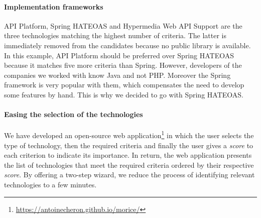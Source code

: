 \paragraph{Implementation frameworks}
API Platform, Spring HATEOAS and Hypermedia Web API Support \cite{salvadori2014framework} are the three technologies matching the highest number of criteria. The latter is immediately removed from the candidates because no public library is available. In this example, API Platform should be preferred over Spring HATEOAS because it matches five more criteria than Spring. However, developers of the companies we worked with know Java and not PHP. Moreover the Spring framework is very popular with them, which compensates the need to develop some features by hand. This is why we decided to go with Spring HATEOAS.

\paragraph{Easing the selection of the technologies}
We have developed an open-source web application{\footnote{\url{https://antoinecheron.github.io/morice/}}} in which the user selects the type of technology, then the required criteria and finally the user gives a \textit{score} to each criterion to indicate its importance. 
In return, the web application presents the list of technologies that meet the required criteria ordered by their respective \textit{score}.
By offering a two-step wizard, we reduce the process of identifying relevant technologies to a few minutes.


